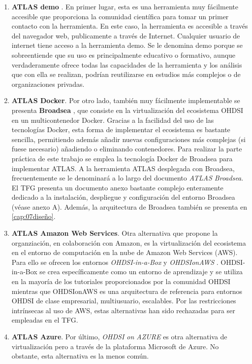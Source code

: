 \begin{enumerate}[label=\alph*.]

    \item \textbf{ATLAS demo} \cite{ATLASdemo}. En primer lugar, esta es una herramienta muy fácilmente accesible que proporciona la comunidad científica para tomar un primer contacto con la herramienta. En este caso, la herramienta es accesible a través del navegador web, publicamente a través de Internet. Cualquier usuario de internet tiene acceso a la herramienta demo. Se le denomina demo porque se sobreentiende que su uso es principalmente educativo o formativo, aunque verdaderamente ofrece todas las capacidades de la herramienta y los análisis que con ella se realizan, podrían reutilizarse en estudios más complejos o de organizaciones privadas.

    \item \textbf{ATLAS Docker}. Por otro lado, también muy fácilmente implementable se presenta \textbf{Broadsea} \cite{githubBroadsea}, que consiste en la virtualización del ecosistema OHDSI en un multicontenedor Docker. Gracias a la facilidad del uso de las tecnologías Docker, esta forma de implementar el ecosistema es bastante sencilla, permitiendo además añadir nuevas configuraciones más complejas (si fuese necesario) añadiendo o eliminando contenedores. Para realizar la parte práctica de este trabajo se emplea la tecnología Docker de Broadsea para implementar ATLAS. A la herramienta ATLAS desplegada con Broadsea, frecuentemente se le denominará a lo largo del documento \textit{ATLAS Broadsea}. El TFG presenta un documento anexo bastante complejo enteramente dedicado a la instalación, despliegue y configuración del entorno Broadsea (véase anexo A). Además, la arquitectura de Broadsea también se presenta en \ref{cap:07diseño}.

    \item \textbf{ATLAS Amazon Web Services}. Otra alternativa que propone la organziación, en colaboración con Amazon, es la virtualización del ecosistema en el entorno de computación en la nube de Amazon Web Services (AWS). Para ello se ofrecen los entornos \textit{OHDSI-in-a-Box} \cite{githubOHDSIBox} y \textit{OHDSIonAWS} \cite{githubOHDSIAWS}. OHDSI-in-a-Box se crea específicamente como un entorno de aprendizaje y se utiliza en la mayoría de los tutoriales proporcionados por la comunidad OHDSI mientras que OHDSIonAWS es una arquitectura de referencia para entornos OHDSI de clase empresarial, multiusuario, escalables. Por las restricciones intrínsecas al uso de AWS, estas alternativas han sido rechazadas para ser empleadas en el TFG.
    
    \item \textbf{ATLAS Azure}. Por último, \textit{OHDSI on AZURE} \cite{OHDSIonAzure} es otra alternativa de virtualización pero a través de la plataforma Microsoft de Azure. No obstante, esta alternativa es la menos común.
    
\end{enumerate}

